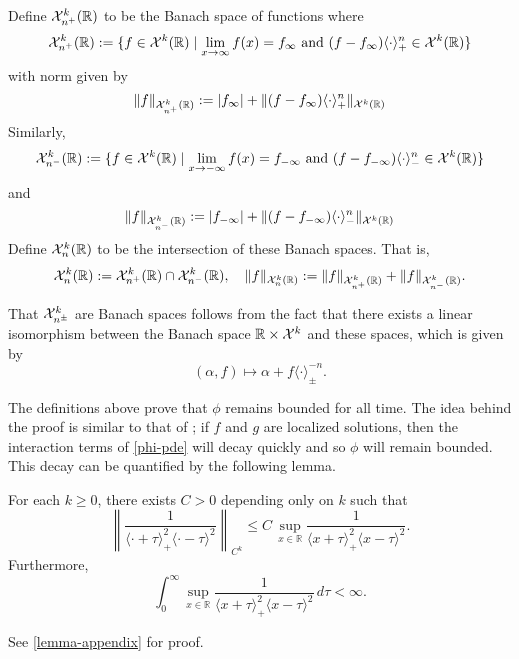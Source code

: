 \begin{defn}
	Define \(\mathcal{X}^k_{n^+} (\mathbb{R})\) to be the Banach space of functions where 
	\begin{equation}
		\mathcal{X}^k_{n^+} (\mathbb{R}) := \{ f \in \mathcal{X}^k(\mathbb{R}) \mid \lim_{x\to\infty} f(x) = f_\infty\text{ and } (f-f_\infty)\langle\cdot\rangle_+^n \in \mathcal{X}^k(\mathbb{R})\}
	\end{equation}
	with norm given by
	\begin{equation}
		\| f \|_{\mathcal{X}^k_{n^+}(\mathbb{R})} := |f_\infty| + \|(f-f_\infty) \langle \cdot \rangle_+^n \|_{\mathcal X^k(\mathbb{R})}
	\end{equation}
	Similarly, 
	\begin{equation}
		\mathcal{X}^k_{n^-} (\mathbb{R}) := \{ f \in \mathcal{X}^k(\mathbb{R}) \mid \lim_{x\to-\infty} f(x) = f_{-\infty}\text{ and } (f-f_{-\infty})\langle\cdot\rangle_-^n \in \mathcal{X}^k(\mathbb{R})\}
	\end{equation}
	and 
	\begin{equation}
		\| f \|_{\mathcal{X}^k_{n^-}(\mathbb{R})} := |f_{-\infty}| + \|(f-f_{-\infty}) \langle \cdot \rangle_-^n \|_{\mathcal X^k(\mathbb{R})}
	\end{equation}
	Define \(\mathcal{X}^k_n(\mathbb{R})\) to be the intersection of these Banach spaces. That is,
	\begin{equation}
		\mathcal{X}^k_n(\mathbb{R}) := \mathcal{X}^k_{n^+} (\mathbb{R}) \cap \mathcal{X}^k_{n^-} (\mathbb{R}), \quad \| f \|_{\mathcal{X}^k_{n} (\mathbb{R})} := \|f\|_{\mathcal{X}^k_{n^+} (\mathbb{R})} + \|f\|_{\mathcal{X}^k_{n^-} (\mathbb{R})}.
	\end{equation}
\end{defn}
	That \(\mathcal{X}^k_{n^\pm}\) are Banach spaces follows from the fact that there exists a linear isomorphism between the Banach space \(\mathbb{R}\times \mathcal{X}^k\) and these spaces, which is given by
\begin{equation}
	(\alpha, f) \mapsto \alpha + f \langle \cdot \rangle^{-n}_{\pm}.
\end{equation}

The definitions above prove that \(\phi\) remains bounded for all time. The idea behind the proof is similar to that of \cite[Lemma~3.1]{schneider2000counter}; if \(f\) and \(g\) are localized solutions, then the interaction terms of \cref{phi-pde} will decay quickly and so \(\phi\) will remain bounded. This decay can be quantified by the following lemma.
\begin{lem}
	For each \(k\geq 0\), there exists \(C> 0\) depending only on \(k\) such that 
	\begin{equation}\label{Ck-bound}
		\left \| \frac 1 {\langle \cdot +\tau\rangle_+^2 \langle \cdot - \tau \rangle^2} \right \|_{C^k} \leq C\, \sup_{x\in\mathbb R} \frac 1 {\langle x +\tau\rangle_+^2 \langle x - \tau \rangle^2}.
	\end{equation}
	Furthermore,
	\begin{equation}
		\int_0^\infty \sup_{x\in\mathbb R} \frac 1 {\langle x +\tau\rangle_+^2 \langle x - \tau \rangle^2}\, d\tau <\infty.
	\end{equation}
\end{lem}
See \cref{lemma-appendix} for proof. 

